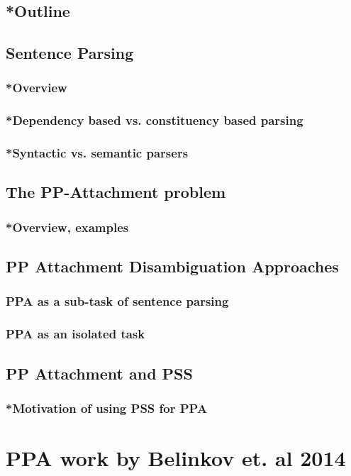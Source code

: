 \subsection{*Outline}
\subsection{Sentence Parsing}
\subsubsection{*Overview}
\subsubsection{*Dependency based vs. constituency based parsing}
\subsubsection{*Syntactic vs. semantic parsers}
\subsection{The PP-Attachment problem}
\subsubsection{*Overview, examples}
\subsection{PP Attachment Disambiguation Approaches}
\subsubsection{PPA as a sub-task of sentence parsing}
\subsubsection{PPA as an isolated task}
\subsection{PP Attachment and PSS}
\subsubsection{*Motivation of using PSS for PPA}
\pagebreak

\section{PPA work by Belinkov et. al 2014}
